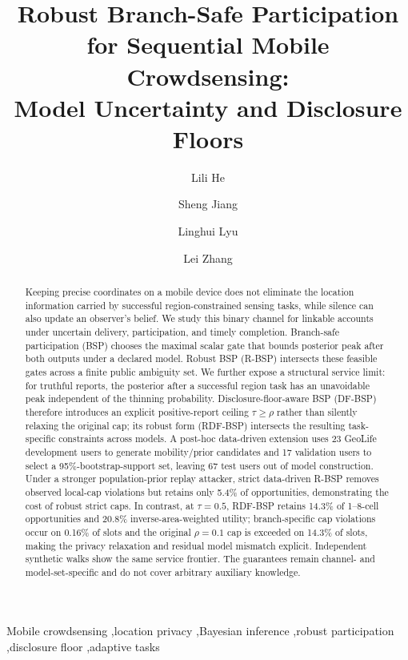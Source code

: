 \documentclass[review,11pt,times]{elsarticle}
\begin{document}
\begin{frontmatter}
\title{Robust Branch-Safe Participation for Sequential Mobile Crowdsensing:\\Model Uncertainty and Disclosure Floors}
\author[aff1]{Lili He}
\author[aff1]{Sheng Jiang}
\author[aff1]{Linghui Lyu}
\author[aff1]{Lei Zhang}
\address[aff1]{College of Information and Electronic Technology, Jiamusi University, Jiamusi 154007, China}
\begin{abstract}
Keeping precise coordinates on a mobile device does not eliminate the location information carried by successful region-constrained sensing tasks, while silence can also update an observer's belief. We study this binary channel for linkable accounts under uncertain delivery, participation, and timely completion. Branch-safe participation (BSP) chooses the maximal scalar gate that bounds posterior peak after both outputs under a declared model. Robust BSP (R-BSP) intersects these feasible gates across a finite public ambiguity set. We further expose a structural service limit: for truthful reports, the posterior after a successful region task has an unavoidable peak independent of the thinning probability. Disclosure-floor-aware BSP (DF-BSP) therefore introduces an explicit positive-report ceiling $\tau\ge\rho$ rather than silently relaxing the original cap; its robust form (RDF-BSP) intersects the resulting task-specific constraints across models. A post-hoc data-driven extension uses 23 GeoLife development users to generate mobility/prior candidates and 17 validation users to select a 95\%-bootstrap-support set, leaving 67 test users out of model construction. Under a stronger population-prior replay attacker, strict data-driven R-BSP removes observed local-cap violations but retains only 5.4\% of opportunities, demonstrating the cost of robust strict caps. In contrast, at $\tau=0.5$, RDF-BSP retains 14.3\% of 1--8-cell opportunities and 20.8\% inverse-area-weighted utility; branch-specific cap violations occur on 0.16\% of slots and the original $\rho=0.1$ cap is exceeded on 14.3\% of slots, making the privacy relaxation and residual model mismatch explicit. Independent synthetic walks show the same service frontier. The guarantees remain channel- and model-set-specific and do not cover arbitrary auxiliary knowledge.
\end{abstract}
\begin{keyword}
Mobile crowdsensing \sep location privacy \sep Bayesian inference \sep robust participation \sep disclosure floor \sep adaptive tasks
\end{keyword}
\end{frontmatter}
\end{document}
